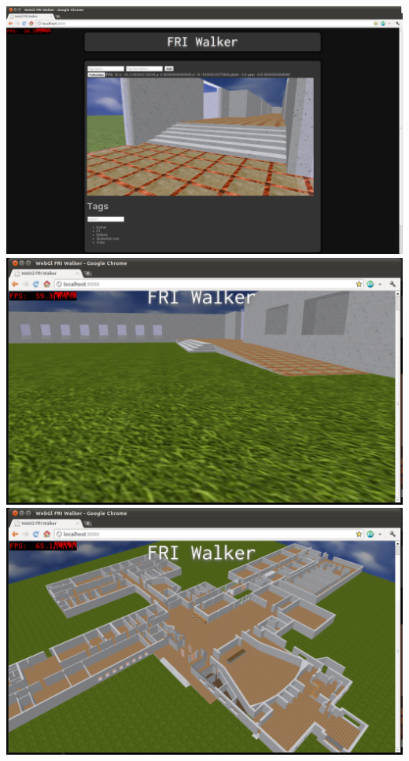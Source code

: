 \documentclass[10pt,a4paper]{article}
\begin{document}
\includegraphics[scale=0.3]{screen4.png}\\
\includegraphics[scale=0.4]{screen5.png}\\
\includegraphics[scale=0.4]{screen6.png}
\end{document}
